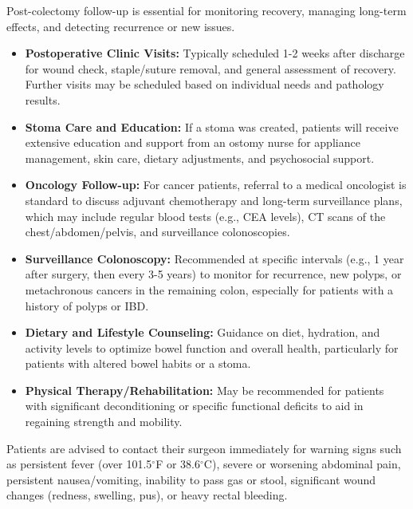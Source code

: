 Post-colectomy follow-up is essential for monitoring recovery, managing long-term effects, and detecting recurrence or new issues.
\begin{itemize}
  \item \textbf{Postoperative Clinic Visits:} Typically scheduled 1-2 weeks after discharge for wound check, staple/suture removal, and general assessment of recovery. Further visits may be scheduled based on individual needs and pathology results.
  \item \textbf{Stoma Care and Education:} If a stoma was created, patients will receive extensive education and support from an ostomy nurse for appliance management, skin care, dietary adjustments, and psychosocial support.
  \item \textbf{Oncology Follow-up:} For cancer patients, referral to a medical oncologist is standard to discuss adjuvant chemotherapy and long-term surveillance plans, which may include regular blood tests (e.g., CEA levels), CT scans of the chest/abdomen/pelvis, and surveillance colonoscopies.
  \item \textbf{Surveillance Colonoscopy:} Recommended at specific intervals (e.g., 1 year after surgery, then every 3-5 years) to monitor for recurrence, new polyps, or metachronous cancers in the remaining colon, especially for patients with a history of polyps or IBD.
  \item \textbf{Dietary and Lifestyle Counseling:} Guidance on diet, hydration, and activity levels to optimize bowel function and overall health, particularly for patients with altered bowel habits or a stoma.
  \item \textbf{Physical Therapy/Rehabilitation:} May be recommended for patients with significant deconditioning or specific functional deficits to aid in regaining strength and mobility.
\end{itemize}
Patients are advised to contact their surgeon immediately for warning signs such as persistent fever (over 101.5$^{\circ}$F or 38.6$^{\circ}$C), severe or worsening abdominal pain, persistent nausea/vomiting, inability to pass gas or stool, significant wound changes (redness, swelling, pus), or heavy rectal bleeding.

